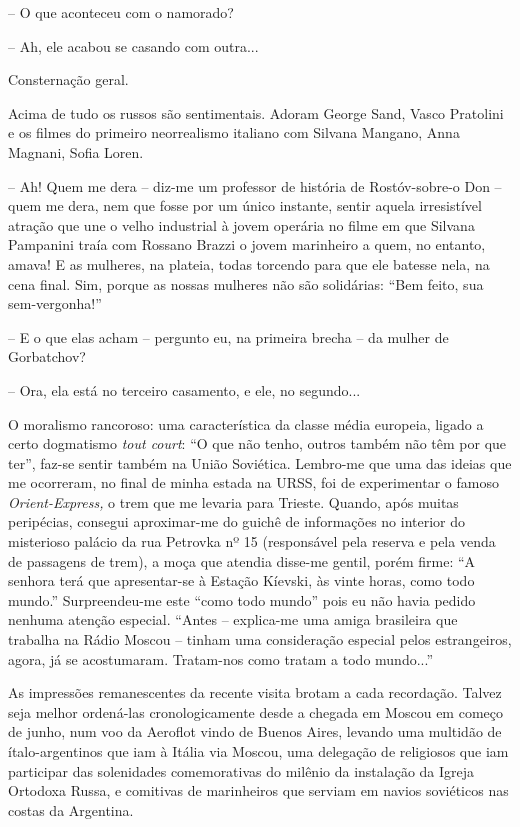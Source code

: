 -- O que aconteceu com o namorado?

-- Ah, ele acabou se casando com outra...

Consternação geral.

Acima de tudo os russos são sentimentais. Adoram George Sand, Vasco
Pratolini e os filmes do primeiro neorrealismo italiano com Silvana
Mangano, Anna Magnani, Sofia Loren.

-- Ah! Quem me dera -- diz-me um professor de história de Rostóv-sobre-o
Don -- quem me dera, nem que fosse por um único instante, sentir aquela
irresistível atração que une o velho industrial à jovem operária no
filme em que Silvana Pampanini traía com Rossano Brazzi o jovem
marinheiro a quem, no entanto, amava! E as mulheres, na plateia, todas
torcendo para que ele batesse nela, na cena final. Sim, porque as nossas
mulheres não são solidárias: ``Bem feito, sua sem-vergonha!''

-- E o que elas acham -- pergunto eu, na primeira brecha -- da mulher de
Gorbatchov?

-- Ora, ela está no terceiro casamento, e ele, no segundo...

O moralismo rancoroso: uma característica da classe média europeia,
ligado a certo dogmatismo \emph{tout court}: ``O que não tenho, outros
também não têm por que ter'', faz-se sentir também na União Soviética.
Lembro-me que uma das ideias que me ocorreram, no final de minha estada
na URSS, foi de experimentar o famoso \emph{Orient-Express,} o trem que
me levaria para Trieste. Quando, após muitas peripécias, consegui
aproximar-me do guichê de informações no interior do misterioso palácio
da rua Petrovka nº 15 (responsável pela reserva e pela venda de
passagens de trem), a moça que atendia disse-me gentil, porém firme: ``A
senhora terá que apresentar-se à Estação Kíevski, às vinte horas, como
todo mundo.'' Surpreendeu-me este ``como todo mundo'' pois eu não havia
pedido nenhuma atenção especial. ``Antes -- explica-me uma amiga
brasileira que trabalha na Rádio Moscou -- tinham uma consideração
especial pelos estrangeiros, agora, já se acostumaram. Tratam-nos como
tratam a todo mundo...''

As impressões remanescentes da recente visita brotam a cada recordação.
Talvez seja melhor ordená-las cronologicamente desde a chegada em Moscou
em começo de junho, num voo da Aeroflot vindo de Buenos Aires, levando
uma multidão de ítalo-argentinos que iam à Itália via Moscou, uma
delegação de religiosos que iam participar das solenidades comemorativas
do milênio da instalação da Igreja Ortodoxa Russa, e comitivas de
marinheiros que serviam em navios soviéticos nas costas da Argentina.

